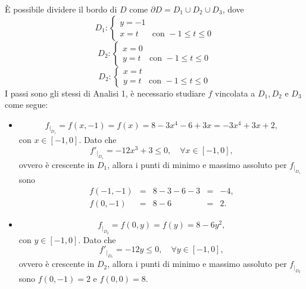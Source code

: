 \begin{example}
	È possibile dividere il bordo di $D$ come $\partial D= D_1\cup D_2\cup D_3$, dove
	\begin{equation*}
		D_1:
		\begin{cases}
			y=-1\\
			x=t&\text{con }  -1\leq t\leq0
		\end{cases}
	\end{equation*}
	\begin{equation*}
		D_2:
		\begin{cases}
			x=0\\
			y=t&\text{con } -1\leq t\leq 0
		\end{cases}
	\end{equation*}
	\begin{equation*}
		D_2:
		\begin{cases}
			x=t\\
			y=t&\text{con } -1\leq t\leq 0
		\end{cases}
	\end{equation*}
	I passi sono gli stessi di Analisi 1, è necessario studiare $f$ vincolata a $D_1, D_2$ e $D_3$ come segue:
	\begin{itemize}
		\item [$\boldsymbol{D_1}$]
		\begin{equation*}
			f_{|_{D_1}} = f(x,-1)= f(x) = 8 -3x^4-6 + 3x = -3x^4 + 3x + 2,
		\end{equation*}
		con $x\in[-1,0]$. Dato che
		\begin{equation*}
			f'_{|_{D_1}} = -12 x^3 + 3 \leq 0,\quad\forall x\in[-1,0],
		\end{equation*}
		ovvero è crescente in $D_1$, allora i punti di minimo e massimo assoluto per $f_{|_{D_1}}$ sono
		\begin{equation*}
			\begin{matrix}
				f(-1,-1)&=&8-3-6-3 &=& -4,\\
				f(0,-1) &=& 8-6 &=& 2.
			\end{matrix}
		\end{equation*}
		\item [$\boldsymbol{D_2}$] 
		\begin{equation*}
			f_{|_{D_2}}= f(0,y)= f(y) = 8 - 6y^2,
			\end{equation*}
			con $y\in[-1,0]$. Dato che
			\begin{equation*}
			f'_{|_{D_1}} = -12 y \leq 0,\quad\forall y\in[-1,0],
			\end{equation*}
			ovvero è crescente in $D_2$, allora i punti di minimo e massimo assoluto per $f_{|_{D_2}}$ sono $f(0,-1) = 2$ e $f(0,0)=8$.

\end{itemize}
\end{example}

